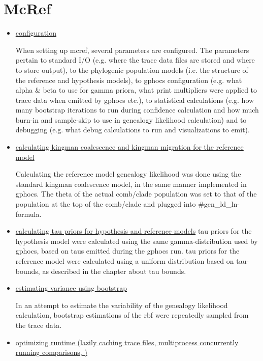 \documentclass[10pt,a4paper]{article}
\begin{document}
\section{McRef}

\begin{itemize}
\item \underline{configuration}

When setting up mcref, several parameters are configured. The parameters pertain to standard I/O (e.g. where the trace data files are stored and where to store output), to the phylogenic population models (i.e. the structure of the reference and hypothesis models), to gphocs configuration (e.g. what alpha \& beta to use for gamma priora, what print multipliers were applied to trace data when emitted by gphocs etc.), to statistical calculations (e.g. how many bootstrap iterations to run during confidence calculation and how much burn-in and sample-skip to use in genealogy likelihood calculation) and to debugging (e.g. what debug calculations to run and visualizations to emit). 

\item \underline{calculating kingman coalescence and kingman migration for the reference model}

Calculating the reference model genealogy likelihood was done using the standard kingman coalescence model, in the same manner implemented in gphocs. The theta of the actual comb/clade population was set to that of the population at the top of the comb/clade and plugged into \#gen\_ld\_ln-formula. 

\item \underline{calculating tau priors for hypothesis and reference models}
tau priors for the hypothesis model were calculated using the same gamma-distribution used by gphocs, based on taus emitted during the gphocs run. tau priors for the reference model were calculated using a uniform distribution based on tau-bounds, as described in the chapter about tau bounds.

\item \underline{estimating variance using bootstrap}

In an attempt to estimate the variability of the genealogy likelihood calculation, bootstrap estimations of the rbf were repeatedly sampled from the trace data. 


\item \underline{optimizing runtime (lazily caching trace files, multiprocess concurrently running comparisons, )}


\end{itemize}
\end{document}
